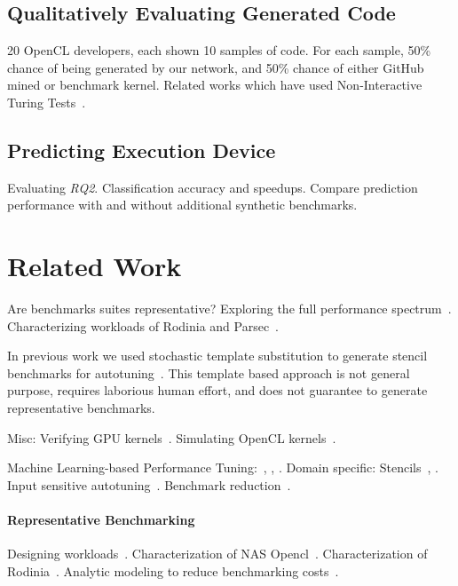 \documentclass[preprint,nonatbib,10pt,nocopyrightspace]{sigplanconf}
\begin{document}
\subsection{Qualitatively Evaluating Generated Code}\label{subsec:}

20 OpenCL developers, each shown 10 samples of code. For each sample,
50\% chance of being generated by our network, and 50\% chance of
either GitHub mined or benchmark kernel. Related works which have used
Non-Interactive Turing Tests~\cite{Gao2015a,Zhang2016}.


\subsection{Predicting Execution Device}\label{subsec:}

Evaluating \emph{RQ2}. Classification accuracy and speedups. Compare
prediction performance with and without additional synthetic
benchmarks.


\section{Related Work}\label{sec:related-work}

Are benchmarks suites representative? Exploring the full performance
spectrum~\cite{Ryoo2015}. Characterizing workloads of Rodinia and
Parsec~\cite{Che2010}.

In previous work we used stochastic template substitution to generate
stencil benchmarks for autotuning~\cite{Cummins2015a}. This template
based approach is not general purpose, requires laborious human
effort, and does not guarantee to generate representative benchmarks.

Misc: Verifying GPU kernels~\cite{Betts2012}. Simulating OpenCL
kernels~\cite{Price2015}.

Machine Learning-based Performance Tuning:~\cite{Wen2015},
\cite{Magni2014}, \cite{Falch2015}. Domain specific:
Stencils~\cite{Garvey2015b}, \cite{Cummins2015a}. Input sensitive
autotuning~\cite{Ding2015}. Benchmark reduction~\cite{Castro2014}.


\paragraph{Representative Benchmarking} Designing
workloads~\cite{Eeckhout2002}. Characterization of NAS
Opencl~\cite{Seo2011}. Characterization of
Rodinia~\cite{Che2010,Ryoo2015}. Analytic modeling to reduce
benchmarking costs~\cite{Kalibera2013}.
\end{document}
